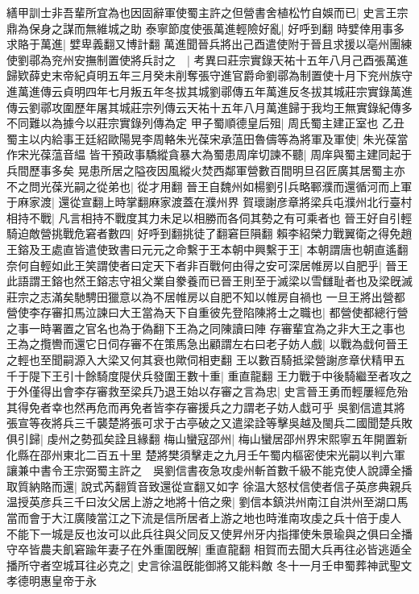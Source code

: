 繕甲訓士非吾輩所宜為也因固辭軍使蜀主許之但營書舍植松竹自娛而已|{
	史言王宗鼎為保身之謀而無維城之助}
泰寧節度使張萬進輕險好亂|{
	好呼到翻}
時嬖倖用事多求賂于萬進|{
	嬖卑義翻又博計翻}
萬進聞晉兵將出己酉遣使附于晉且求援以亳州團練使劉鄩為兖州安撫制置使將兵討之　|{
	考異曰莊宗實錄天祐十五年八月己酉張萬進歸欵薛史末帝紀貞明五年三月癸未削奪張守進官爵命劉鄩為制置使十月下兖州族守進萬進傳云貞明四年七月叛五年冬拔其城劉鄩傳五年萬進反冬拔其城莊宗實錄萬進傳云劉鄩攻圍歷年屠其城莊宗列傳云天祐十五年八月萬進歸于我均王無實錄紀傳多不同難以為據今以莊宗實錄列傳為定}
甲子蜀順德皇后殂|{
	周氏蜀主建正室也}
乙丑蜀主以内給事王廷紹歐陽晃李周輅朱光葆宋承蕰田魯儔等為將軍及軍使|{
	朱光葆當作宋光葆蕰音緼}
皆干預政事驕縱貪暴大為蜀患周庠切諫不聽|{
	周庠與蜀主建同起于兵間歷事多矣}
晃患所居之隘夜因風縱火焚西鄰軍營數百間明旦召匠廣其居蜀主亦不之問光葆光嗣之從弟也|{
	從才用翻}
晉王自魏州如楊劉引兵略鄆濮而還循河而上軍于麻家渡|{
	還從宣翻上時掌翻麻家渡蓋在濮州界}
賀瓌謝彦章將梁兵屯濮州北行臺村相持不戰|{
	凡言相持不戰度其力未足以相勝而各伺其勢之有可乘者也}
晉王好自引輕騎迫敵營挑戰危窘者數四|{
	好呼到翻挑徒了翻窘巨隕翻}
賴李紹榮力戰翼衛之得免趙王鎔及王處直皆遣使致書曰元元之命繫于王本朝中興繫于王|{
	本朝謂唐也朝直遙翻}
奈何自輕如此王笑謂使者曰定天下者非百戰何由得之安可深居帷房以自肥乎|{
	晉王此語謂王鎔也然王鎔志守祖父業自豢養而已晉王則至于滅梁以雪讎耻者也及梁旣滅莊宗之志滿矣馳騁田獵意以為不居帷房以自肥不知以帷房自禍也}
一旦王將出營都營使李存審扣馬泣諫曰大王當為天下自重彼先登陷陳將士之職也|{
	都營使都總行營之事一時署置之官名也為于偽翻下王為之同陳讀曰陣}
存審輩宜為之非大王之事也王為之攬轡而還它日伺存審不在策馬急出顧謂左右曰老子妨人戲|{
	以戰為戱何晉王之輕也至聞嗣源入大梁又何其衰也歟伺相吏翻}
王以數百騎抵梁營謝彦章伏精甲五千于隄下王引十餘騎度隄伏兵發圍王數十重|{
	重直龍翻}
王力戰于中後騎繼至者攻之于外僅得出會李存審救至梁兵乃退王始以存審之言為忠|{
	史言晉王勇而輕屢經危殆其得免者幸也然再危而再免者皆李存審援兵之力謂老子妨人戱可乎}
吳劉信遣其將張宣等夜將兵三千襲楚將張可求于古亭破之又遣梁詮等擊吳越及閩兵二國聞楚兵敗俱引歸|{
	虔州之勢孤矣詮且緣翻}
梅山蠻寇邵州|{
	梅山蠻居邵州界宋熙寧五年開置新化縣在邵州東北二百五十里}
楚將樊須擊走之九月壬午蜀内樞密使宋光嗣以判六軍讓兼中書令王宗弼蜀主許之　吳劉信書夜急攻虔州斬首數千級不能克使人說譚全播取質納賂而還|{
	說式芮翻質音致還從宣翻又如字}
徐温大怒杖信使者信子英彦典親兵温授英彦兵三千曰汝父居上游之地將十倍之衆|{
	劉信本鎮洪州南江自洪州至湖口馬當而會于大江廣陵當江之下流是信所居者上游之地也時淮南攻虔之兵十倍于虔人}
不能下一城是反也汝可以此兵往與父同反又使昇州牙内指揮使朱景瑜與之俱曰全播守卒皆農夫飢窘踰年妻子在外重圍旣解|{
	重直龍翻}
相賀而去聞大兵再往必皆逃遁全播所守者空城耳往必克之|{
	史言徐温旣能御將又能料敵}
冬十一月壬申蜀葬神武聖文孝德明惠皇帝于永

